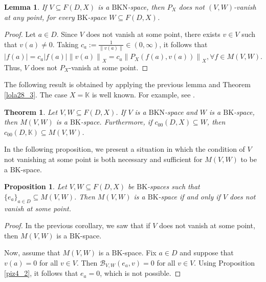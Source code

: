 \documentclass[14pt, a4paper]{article}  %
\providecommand{\pare}[1]{\left( #1\right) }
\providecommand{\norm}[1]{\left\lVert#1\right\rVert}
\providecommand{\abs}[1]{\left\lvert#1\right\rvert}
\newcommand{\K}{\mathbb{K}}
\newcommand{\BK}{\text{BK}}
\newcommand{\BKn}{\text{BKN}}
\newcommand{\BB}{\mathscr{B}}
\newtheorem{proposition}{Proposition}[section]
\newtheorem{theorem}{Theorem}[section]
\newtheorem{lemma}{Lemma}[section]
\begin{document}
\begin{lemma}\label{efren6}  
	If $V \subseteq F(D,X)$ is a $\BKn$-space, then $P_X$ does not $(V,W)$-vanish at any point, for every $\BK$-space $W\subseteq F\pare{D,X}$.  
\end{lemma}  
\begin{proof}  
	Let $a\in D$. Since $V$ does not vanish at some point, there exists $v\in V$ such that $v(a)\neq 0$. Taking $c_{a}:=\frac{1}{\norm{v(a)}}\in (0,\infty)$, it follows that $\abs{f(a)} =c_{a}\abs{f(a)}\norm{v(a)}_{X}=c_{a}\norm{P_{X}(f(a),v(a))}_{X}, \forall f\in M(V,W).$  
	Thus, $V$ does not $P_{X}$-vanish at some point.  
\end{proof}  

  

The following result is obtained by applying the previous lemma and Theorem \ref{lola28_3}.  The case $X = \K$ is well known. For example, see \cite[Thm 4.3.15]{Wil}.

\begin{theorem}\label{q31_3_0_0}\label{d318_1_0_0} \label{d328_0_0_0}  
	Let $V,W\subseteq F(D,X)$. If $V$ is a $\BKn$-space   and $W$ is a $\BK$-space, then $M(V,W)$ is a $\BK$-space. Furthermore, if $c_{00}(D,X) \subseteq W$, then $c_{00}(D,\K) \subseteq M(V,W)$. 
\end{theorem}  

 


In the following proposition, we present a situation in which the condition of $V$ not vanishing at some point is both necessary and sufficient for $M(V,W)$ to be a $\BK$-space.  

\begin{proposition}\label{d343_0_new_0}  
	Let $V,W\subseteq F(D,X)$ be $\BK$-spaces such that $\{e_{a}\}_{a\in D}\subseteq M(V,W)$. Then $M(V,W)$ is a $\BK$-space if and only if $V$ does not vanish at some point.  
\end{proposition}  
\begin{proof}  
	In the previous corollary, we saw that if $V$ does not vanish at some point, then $M(V,W)$ is a $\BK$-space.  
	
	Now, assume that $M(V,W)$ is a $\BK$-space. Fix $a\in D$ and suppose that $v(a)=0$ for all $v\in V$. Then $\BB_{V,W}(e_{a},v)=0$ for all $v\in V$. Using Proposition \ref{piz4_2}, it follows that $e_{a}=0$, which is not possible.  
\end{proof}  



 
\end{document}
